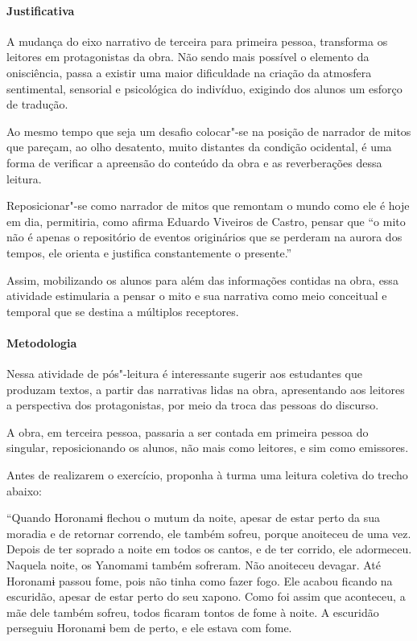 \documentclass[12pt]{extarticle}
\begin{document}
{\paragraph{Justificativa} A mudança do eixo narrativo de terceira para primeira
pessoa, transforma os leitores em protagonistas da obra. Não sendo mais possível
o elemento da onisciência, passa a existir uma maior dificuldade na criação da 
atmosfera sentimental, sensorial e psicológica do indivíduo, exigindo dos alunos
um esforço de tradução.

Ao mesmo tempo que seja um desafio colocar"-se na posição de narrador de mitos que 
pareçam, ao olho desatento, muito distantes da condição ocidental, é uma forma de 
verificar a apreensão do conteúdo da obra e as reverberações dessa leitura. 

Reposicionar"-se como narrador de mitos que remontam o mundo como ele é hoje em dia, 
permitiria, como afirma Eduardo Viveiros de Castro, pensar que ``o mito não é apenas 
o repositório de eventos originários que se perderam na aurora dos tempos, ele orienta 
e justifica constantemente o presente.'' 

Assim, mobilizando os alunos para além das informações contidas na obra, essa atividade 
estimularia a pensar o mito e sua narrativa como meio conceitual e temporal que se destina
a múltiplos receptores.

\paragraph{Metodologia}

Nessa atividade de pós"-leitura é interessante sugerir aos estudantes que
produzam textos, a partir das narrativas lidas na obra, apresentando aos leitores a 
perspectiva dos protagonistas, por meio da troca das pessoas do discurso.

A obra, em terceira pessoa, passaria a ser contada em primeira pessoa do singular,
reposicionando os alunos, não mais como leitores, e sim como emissores.

Antes de realizarem o exercício, proponha à turma uma leitura coletiva do trecho abaixo:

``Quando Horonamɨ flechou o mutum da noite, apesar de estar perto da sua moradia e de retornar 
correndo, ele também sofreu, porque anoiteceu de uma vez. Depois de ter soprado a noite em todos
os cantos, e de ter corrido, ele adormeceu. Naquela noite, os Yanomami também sofreram. Não anoiteceu
devagar. Até Horonamɨ passou fome, pois não tinha como fazer fogo. Ele acabou ficando na escuridão, 
apesar de estar perto do seu xapono. Como foi assim que aconteceu, a mãe dele também sofreu, todos 
ficaram tontos de fome à noite. A escuridão perseguiu Horonamɨ bem de perto, e ele estava com fome.

}
\end{document}
